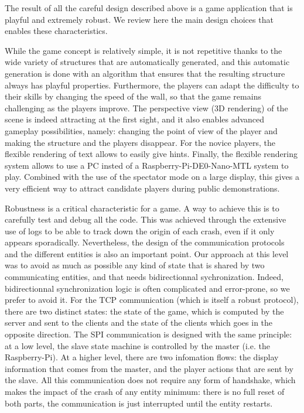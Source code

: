 \documentclass[english, DIV=13]{scrreprt}
\begin{document}

The result of all the careful design described above is a game application that
is playful and extremely robust. We review here the main design choices that
enables these characteristics.

While the game concept is relatively simple, it is not repetitive thanks to the
wide variety of structures that are automatically generated, and this automatic
generation is done with an algorithm that ensures that the resulting structure
always has playful properties. Furthermore, the players can adapt the
difficulty to their skills by changing the speed of the wall, so that the game
remains challenging as the players improve. The perspective view (3D rendering)
of the scene is indeed attracting at the first sight, and it also enables
advanced gameplay possibilities, namely: changing the point of view of the
player and making the structure and the players disappear. For the novice
players, the flexible rendering of text allows to easily give hints. Finally,
the flexible rendering system allows to use a PC insted of a
Raspberry-Pi-DE0-Nano-MTL system to play. Combined with the use of the spectator
mode on a large display, this gives a very efficient way to attract candidate players
during public demonstrations.

Robustness is a critical characteristic for a game. A way to achieve this is to
carefully test and debug all the code. This
was achieved through the extensive use of logs to be able to track down the
origin of each crash, even if it only appears sporadically. Nevertheless, the
design of the communication protocols and the different entities is also an
important point. Our approach at this level was to avoid as much as possible any
kind of state that is shared by two communicating entities, and that needs
bidirectionnal sychronization. Indeed, bidirectionnal synchronization logic is often
complicated and error-prone, so we prefer to avoid it. For the TCP
communication (which is itself a robust protocol), there are two distinct
states: the state of the game, which is computed by the server and sent to the
clients and the state of the clients which goes in the opposite direction. The SPI
communication is designed with the same principle: at a low level, the slave state
machine is controlled by the master (i.e. the Raspberry-Pi). At a higher level,
there are two infomation flows: the display information that comes from the
master, and the player actions that are sent by the slave. All this
communication does not require any form of handshake, which makes the impact of
the crash of any entity minimum: there is no full reset of both parts, the
communication is just interrupted until the entity restarts.
\end{document}
